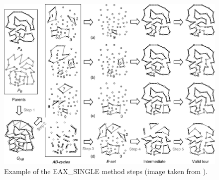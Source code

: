\begin{figure}[h]
	\centering
	\includegraphics[width=1.0\columnwidth]{img/GA_steps}
	\caption{Example of the EAX\_SINGLE method steps (image taken from \cite{Nagata2013}).}
	\label{fig:GA_steps}
\end{figure}

